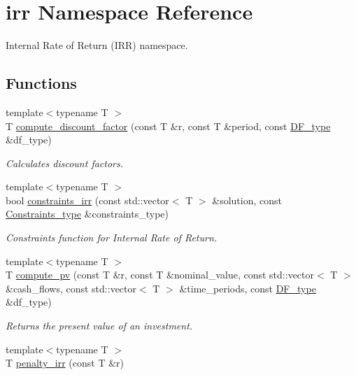 \hypertarget{namespaceirr}{}\section{irr Namespace Reference}
\label{namespaceirr}


Internal Rate of Return (I\+RR) namespace.  


\subsection*{Functions}
\begin{DoxyCompactItemize}
\item 
{\footnotesize template$<$typename T $>$ }\\T \hyperlink{namespaceirr_ae00c3409ca39fa2dc47ce61da4169a66}{compute\+\_\+discount\+\_\+factor} (const T \&r, const T \&period, const \hyperlink{namespaceutilities_ad4290e607d0651ce53db6e5c776aca7c}{D\+F\+\_\+type} \&df\+\_\+type)
\begin{DoxyCompactList}\small\item\em Calculates discount factors. \end{DoxyCompactList}\item 
{\footnotesize template$<$typename T $>$ }\\bool \hyperlink{namespaceirr_a6801aa96a307b3f52817dd1a3bcd065e}{constraints\+\_\+irr} (const std\+::vector$<$ T $>$ \&solution, const \hyperlink{namespaceutilities_ab1a1517bf6e62a1acfab5293ca8985c1}{Constraints\+\_\+type} \&constraints\+\_\+type)
\begin{DoxyCompactList}\small\item\em Constraints function for Internal Rate of Return. \end{DoxyCompactList}\item 
{\footnotesize template$<$typename T $>$ }\\T \hyperlink{namespaceirr_ac3411cd2ad174f399c525d8d17dcdad0}{compute\+\_\+pv} (const T \&r, const T \&nominal\+\_\+value, const std\+::vector$<$ T $>$ \&cash\+\_\+flows, const std\+::vector$<$ T $>$ \&time\+\_\+periods, const \hyperlink{namespaceutilities_ad4290e607d0651ce53db6e5c776aca7c}{D\+F\+\_\+type} \&df\+\_\+type)
\begin{DoxyCompactList}\small\item\em Returns the present value of an investment. \end{DoxyCompactList}\item 
{\footnotesize template$<$typename T $>$ }\\T \hyperlink{namespaceirr_abd1d21a84003df6b46dc32c3a30d2269}{penalty\+\_\+irr} (const T \&r)

\end{DoxyCompactItemize}

